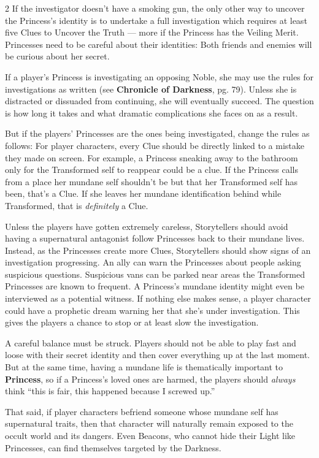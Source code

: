 \begin{multicols}{2}
If the investigator doesn't have a smoking gun, the only other way to uncover the Princess's identity is to undertake a full investigation which requires at least five Clues to Uncover the Truth — more if the Princess has the Veiling Merit. Princesses need to be careful about their identities: Both friends and enemies will be curious about her secret. 

If a player's Princess is investigating an opposing Noble, she may use the rules for investigations as written (see \textbf{Chronicle of Darkness}, pg. 79). Unless she is distracted or dissuaded from continuing, she will eventually succeed. The question is how long it takes and what dramatic complications she faces on as a result. 

But if the players' Princesses are the ones being investigated, change the rules as follows: For player characters, every Clue should be directly linked to a mistake they made on screen. For example, a Princess sneaking away to the bathroom only for the Transformed self to reappear could be a clue. If the Princess calls from a place her mundane self shouldn't be but that her Transformed self has been, that's a Clue. If she leaves her mundane identification behind while Transformed, that is \textit{definitely} a Clue.

Unless the players have gotten extremely careless, Storytellers should avoid having a supernatural antagonist follow Princesses back to their mundane lives. Instead, as the Princesses create more Clues, Storytellers should show signs of an investigation progressing. An ally can warn the Princesses about people asking suspicious questions. Suspicious vans can be parked near areas the Transformed Princesses are known to frequent. A Princess's mundane identity might even be interviewed as a potential witness. If nothing else makes sense, a player character could have a prophetic dream warning her that she's under investigation. This gives the players a chance to stop or at least slow the investigation.  

A careful balance must be struck. Players should not be able to play fast and loose with their secret identity and then cover everything up at the last moment. But at the same time, having a mundane life is thematically important to \textbf{Princess}, so if a Princess's loved ones are harmed, the players should \textit{always} think “this is fair, this happened because I screwed up.” 

That said, if player characters befriend someone whose mundane self has supernatural traits, then that character will naturally remain exposed to the occult world and its dangers. Even Beacons, who cannot hide their Light like Princesses, can find themselves targeted by the Darkness.


\end{multicols}
